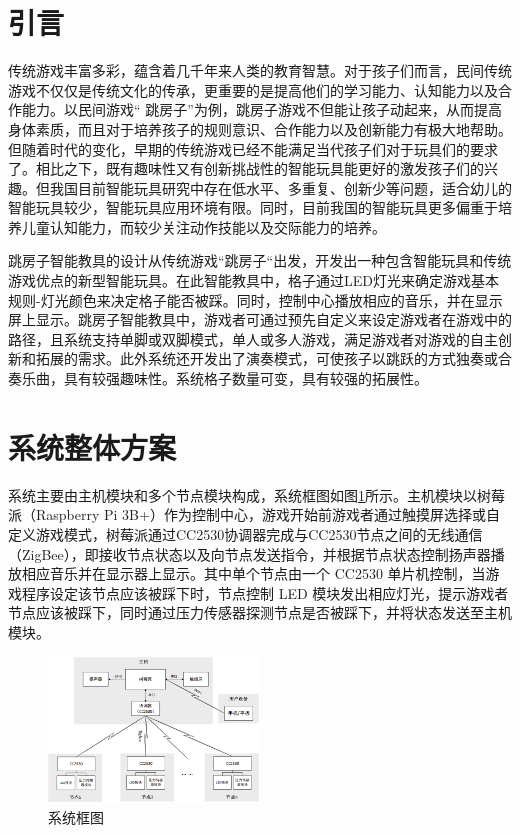 \begin{spacing}{1.2}
\songti

\section{引言}
    传统游戏丰富多彩，蕴含着几千年来人类的教育智慧\supercite{1}。对于孩子们而言，民间传统游戏不仅仅是传统文化的传承，更重要的是提高他们的学习能力、认知能力以及合作能力。以民间游戏“ 跳房子”为例，跳房子游戏不但能让孩子动起来，从而提高身体素质，而且对于培养孩子的规则意识、合作能力以及创新能力有极大地帮助\supercite{2,3}。但随着时代的变化，早期的传统游戏已经不能满足当代孩子们对于玩具们的要求了\supercite{6}。相比之下，既有趣味性又有创新挑战性的智能玩具能更好的激发孩子们的兴趣。但我国目前智能玩具研究中存在低水平、多重复、创新少等问题\supercite{4}，适合幼儿的智能玩具较少，智能玩具\supercite{7}应用环境有限。同时，目前我国的智能玩具更多偏重于培养儿童认知能力，而较少关注动作技能以及交际能力的培养\supercite{8}。

    跳房子智能教具的设计从传统游戏“跳房子“出发，开发出一种包含智能玩具和传统游戏优点的新型智能玩具。在此智能教具中，格子通过LED灯光来确定游戏基本规则-灯光颜色来决定格子能否被踩。同时，控制中心播放相应的音乐，并在显示屏上显示。跳房子智能教具中，游戏者可通过预先自定义来设定游戏者在游戏中的路径，且系统支持单脚或双脚模式，单人或多人游戏，满足游戏者对游戏的自主创新和拓展的需求\supercite{4,10}。此外系统还开发出了演奏模式，可使孩子以跳跃的方式独奏或合奏乐曲，具有较强趣味性。系统格子数量可变，具有较强的拓展性。

\section{系统整体方案}
    系统主要由主机模块和多个节点模块构成，系统框图如图\ref{fig:kuangtu}所示。主机模块以树莓派（Raspberry Pi 3B+）作为控制中心，游戏开始前游戏者通过触摸屏选择或自定义游戏模式，树莓派通过CC2530协调器完成与CC2530节点之间的无线通信（ZigBee），即接收节点状态以及向节点发送指令，并根据节点状态控制扬声器播放相应音乐并在显示器上显示。其中单个节点由一个 CC2530 单片机控制，当游戏程序设定该节点应该被踩下时，节点控制 LED 模块发出相应灯光，提示游戏者节点应该被踩下，同时通过压力传感器探测节点是否被踩下，并将状态发送至主机模块。

\begin{figure}[htb]
    \centering
    {\includegraphics [width=0.5\textwidth]{./image/框图V3.png}
    \caption{系统框图}
    \label{fig:kuangtu}}
\end{figure}


\end{spacing}
